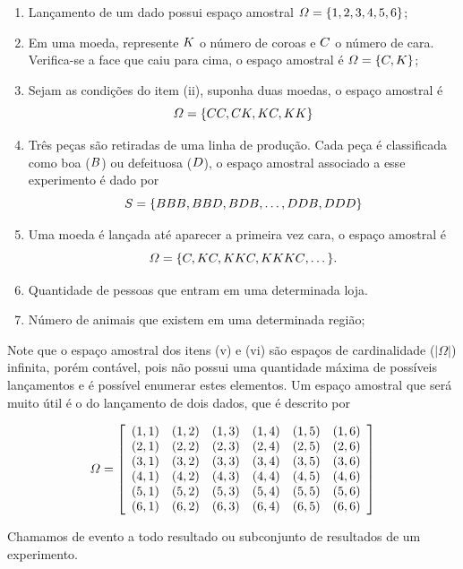 \exemplo
\begin{enumerate}
		\item[(i)] Lançamento de um dado possui espaço amostral $\mathnormal{\Omega} = \{1,2,3,4,5,6\}$;
		\item[(ii)]  Em uma moeda, represente $\mathnormal{K}$ o número de coroas e $\mathnormal{C}$ o número de cara. Verifica-se a face que caiu para cima, o espaço amostral é $\mathnormal{\Omega} = \{\mathnormal{C},\mathnormal{K}\}$;
		\item[(iii)] Sejam as condições do item (ii), suponha duas moedas, o espaço amostral é
		$$\mathnormal{\Omega} = \{\mathnormal{CC,CK,KC,KK}\}$$
		\item[(iv)] Três peças são retiradas de uma linha de produção. Cada peça é classificada como boa ($\mathnormal{B}$) ou defeituosa ($\mathnormal{D}$), o espaço amostral associado a esse experimento é dado por 
		$$\mathnormal{S} = \{\mathnormal{BBB, BBD, BDB,\dots, DDB, DDD}\}$$
		\item[(v)] Uma moeda é lançada até aparecer a primeira vez cara, o espaço amostral é
			$$\mathnormal{\Omega} = \{\mathnormal{C, KC, KKC, KKKC},\dots\}.$$
		\item [(vi)] Quantidade de pessoas que entram em uma determinada loja.
		\item [(vii)] Número de animais que existem em uma determinada região;
	\end{enumerate}
\inic Note que o espaço amostral dos itens (v) e (vi) são espaços de cardinalidade ($|\Omega|$) infinita, porém contável, pois não possui uma quantidade máxima de possíveis lançamentos e é possível enumerar estes elementos. Um espaço amostral que será muito útil é o do lançamento de dois dados, que é descrito por

\begin{equation}
\label{EAU}
	\mathnormal{\Omega}=\left[
	\begin{array}{cccccc}
	(1,1) & (1,2) & (1,3)& (1,4)&(1,5)&(1,6)\\
	(2,1) & (2,2) & (2,3)& (2,4)&(2,5)&(2,6)\\
	(3,1) & (3,2) & (3,3)& (3,4)&(3,5)&(3,6)\\
	(4,1) & (4,2) & (4,3)& (4,4)&(4,5)&(4,6)\\
	(5,1) & (5,2) & (5,3)& (5,4)&(5,5)&(5,6)\\
	(6,1) & (6,2) & (6,3)& (6,4)&(6,5)&(6,6)\\
	\end{array}
	\right]
\end{equation}
\begin{defin}[Evento]
 Chamamos de evento a todo resultado ou subconjunto de resultados de um experimento.
\end{defin}

